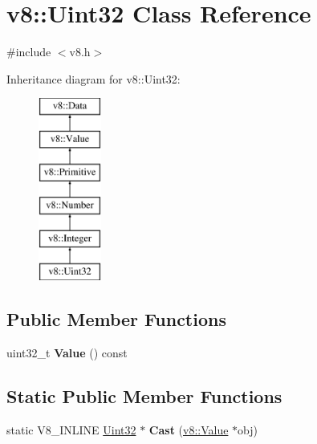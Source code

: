 \hypertarget{classv8_1_1_uint32}{}\section{v8\+:\+:Uint32 Class Reference}
\label{classv8_1_1_uint32}


{\ttfamily \#include $<$v8.\+h$>$}

Inheritance diagram for v8\+:\+:Uint32\+:\begin{figure}[H]
\begin{center}
\leavevmode
\includegraphics[height=6.000000cm]{classv8_1_1_uint32}
\end{center}
\end{figure}
\subsection*{Public Member Functions}
\begin{DoxyCompactItemize}
\item 
uint32\+\_\+t {\bfseries Value} () const \hypertarget{classv8_1_1_uint32_ad59790c380f4de98c4cc479140812fe0}{}\label{classv8_1_1_uint32_ad59790c380f4de98c4cc479140812fe0}

\end{DoxyCompactItemize}
\subsection*{Static Public Member Functions}
\begin{DoxyCompactItemize}
\item 
static V8\+\_\+\+I\+N\+L\+I\+NE \hyperlink{classv8_1_1_uint32}{Uint32} $\ast$ {\bfseries Cast} (\hyperlink{classv8_1_1_value}{v8\+::\+Value} $\ast$obj)\hypertarget{classv8_1_1_uint32_a41a1785c19221868e338b93faa383b62}{}\label{classv8_1_1_uint32_a41a1785c19221868e338b93faa383b62}

\end{DoxyCompactItemize}
